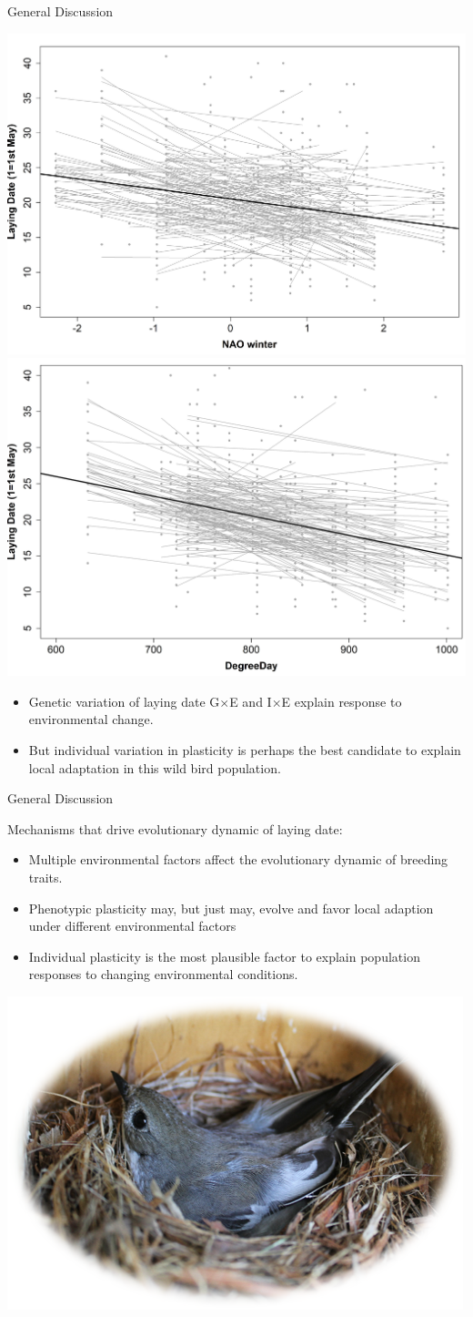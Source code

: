 \documentclass[compress]{beamer}
\begin{document}
\begin{frame}{General Discussion}

\centering
\includegraphics[height = 3.7 cm]{Chapter/RNNAO1.jpg}
\includegraphics[height = 3.7 cm]{Chapter/RNDD1.jpg}\\
 \vspace{0.2cm}
 \raggedright

  \begin{itemize}
\item <1->
Genetic variation of laying date G$\times$E and I$\times$E explain response to environmental change.\\
\item <2->But individual variation in plasticity is perhaps the best candidate to explain local adaptation in this wild bird population.
  \end{itemize}

\end{frame}
\begin{frame}{General Discussion}

Mechanisms that drive evolutionary dynamic of laying date: \\
\begin{itemize}
\item Multiple environmental factors affect the evolutionary dynamic of breeding traits.
\item Phenotypic plasticity may, but just may, evolve and favor local adaption under different environmental factors
\item Individual plasticity is the most plausible factor to explain population responses to changing environmental conditions.
\end{itemize}


\vspace{0.5cm}
\centering
  \includegraphics[height = 3 cm]{egg2.png} 

\end{frame}
\end{document}

